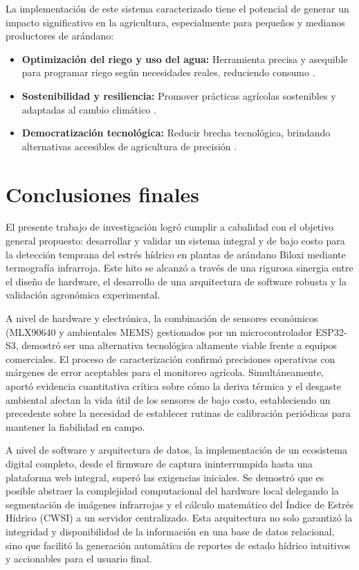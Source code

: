 La implementación de este sistema caracterizado tiene el potencial de generar un impacto significativo en la agricultura, especialmente para pequeños y medianos productores de arándano:
\begin{itemize}
    \item \textbf{Optimización del riego y uso del agua:} Herramienta precisa y asequible para programar riego según necesidades reales, reduciendo consumo .
    \item \textbf{Sostenibilidad y resiliencia:} Promover prácticas agrícolas sostenibles y adaptadas al cambio climático .
    \item \textbf{Democratización tecnológica:} Reducir brecha tecnológica, brindando alternativas accesibles de agricultura de precisión .
\end{itemize}

\section{Conclusiones finales}
\label{sec:conclusiones_finales}

El presente trabajo de investigación logró cumplir a cabalidad con el objetivo general propuesto: desarrollar y validar un sistema integral y de bajo costo para la detección temprana del estrés hídrico en plantas de arándano Biloxi mediante termografía infrarroja. Este hito se alcanzó a través de una rigurosa sinergia entre el diseño de hardware, el desarrollo de una arquitectura de software robusta y la validación agronómica experimental.

A nivel de hardware y electrónica, la combinación de sensores económicos (MLX90640 y ambientales MEMS) gestionados por un microcontrolador ESP32-S3, demostró ser una alternativa tecnológica altamente viable frente a equipos comerciales. El proceso de caracterización confirmó precisiones operativas con márgenes de error aceptables para el monitoreo agrícola. Simultáneamente, aportó evidencia cuantitativa crítica sobre cómo la deriva térmica y el desgaste ambiental afectan la vida útil de los sensores de bajo costo, estableciendo un precedente sobre la necesidad de establecer rutinas de calibración periódicas para mantener la fiabilidad en campo.

A nivel de software y arquitectura de datos, la implementación de un ecosistema digital completo, desde el firmware de captura ininterrumpida hasta una plataforma web integral, superó las exigencias iniciales. Se demostró que es posible abstraer la complejidad computacional del hardware local delegando la segmentación de imágenes infrarrojas y el cálculo matemático del Índice de Estrés Hídrico (CWSI) a un servidor centralizado. Esta arquitectura no solo garantizó la integridad y disponibilidad de la información en una base de datos relacional, sino que facilitó la generación automática de reportes de estado hídrico intuitivos y accionables para el usuario final.

